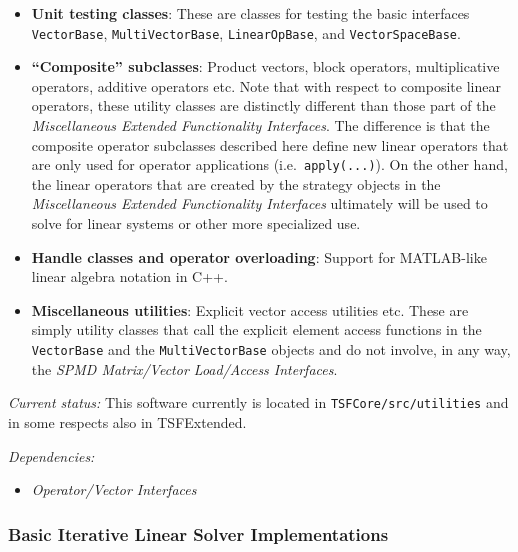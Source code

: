 \documentclass[pdf,ps2pdf,11pt]{SANDreport}
\begin{document}
\begin{itemize}

{}\item{}\textbf{Unit testing classes}: These are classes for testing
the basic interfaces {}\texttt{Vector\-Base}, {}\texttt{Multi\-Vector\-Base},
{}\texttt{Linear\-Op\-Base}, and {}\texttt{Vector\-Space\-Base}.

{}\item{}\textbf{``Composite'' subclasses}: Product vectors, block operators,
multiplicative operators, additive operators etc.  Note that with respect to
composite linear operators, these utility classes are distinctly different
than those part of the {}\textit{Miscellaneous Extended Functionality
Interfaces}.  The difference is that the composite operator subclasses
described here define new linear operators that are only used for operator
applications (i.e.\ {}\texttt{apply(...)}).  On the other hand, the linear
operators that are created by the strategy objects in the
{}\textit{Miscellaneous Extended Functionality Interfaces} ultimately will be
used to solve for linear systems or other more specialized use.

{}\item{}\textbf{Handle classes and operator overloading}: Support for
MATLAB-like linear algebra notation in C++.

{}\item{}\textbf{Miscellaneous utilities}: Explicit vector access utilities
etc.  These are simply utility classes that call the explicit element access
functions in the {}\texttt{Vector\-Base} and the
{}\texttt{Multi\-Vector\-Base} objects and do not involve, in any way, the
{}\textit{{SPMD Matrix/Vector Load/Access Interfaces}}.

\end{itemize}

{}\textit{Current status:} This software currently is located in
{}\texttt{TSFCore/src/utilities} and in some respects also in TSFExtended.

{}\textit{Dependencies:}
\begin{itemize}
{}\item{}\textit{Operator/Vector Interfaces}
\end{itemize}

%
\subsubsection{Basic Iterative Linear Solver Implementations}
%
\end{document}
